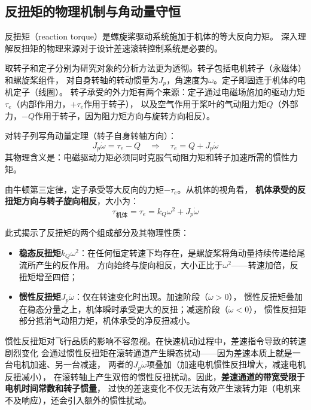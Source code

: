 \documentclass[a4paper,12pt]{ctexart}
\theoremstyle{plain}
\theoremstyle{definition}
\begin{document}
\subsection{反扭矩的物理机制与角动量守恒}

反扭矩（reaction torque）是螺旋桨驱动系统施加于机体的等大反向力矩。
深入理解反扭矩的物理来源对于设计差速滚转控制系统是必要的。

取转子和定子分别为研究对象的分析方法更为透彻。转子包括电机转子（永磁体）和螺旋桨组件，
对自身转轴的转动惯量为$J_p$，角速度为$\omega$。定子即固连于机体的电机定子（线圈）。
转子承受的外力矩有两个来源：定子通过电磁场施加的驱动力矩$\tau_e$（内部作用力，$+\tau_e$作用于转子），
以及空气作用于桨叶的气动阻力矩$Q$（外部力，$-Q$作用于转子，因为阻力矩方向与旋转方向相反）\cite{ducard2011fault}。

对转子列写角动量定理（转子自身转轴方向）：
\begin{equation}
    J_p \dot{\omega} = \tau_e - Q \quad\Longrightarrow\quad
    \tau_e = Q + J_p \dot{\omega}
    \label{eq:rotor_angular}
\end{equation}
其物理含义是：电磁驱动力矩必须同时克服气动阻力矩和转子加速所需的惯性力矩。

由牛顿第三定律，定子承受等大反向的力矩$-\tau_e$。从机体的视角看，
\textbf{机体承受的反扭矩方向与转子旋向相反}，大小为：
\begin{equation}
    \boxed{\tau_{\text{机体}} = \tau_e = k_Q \omega^2 + J_p \dot{\omega}}
    \label{eq:reaction_torque}
\end{equation}

此式揭示了反扭矩的两个组成部分及其物理性质：
\begin{itemize}
    \item \textbf{稳态反扭矩}$k_Q \omega^2$：在任何恒定转速下均存在，是螺旋桨将角动量持续传递给尾流所产生的反作用。
          方向始终与旋向相反，大小正比于$\omega^2$——转速加倍，反扭矩增至四倍；
    \item \textbf{惯性反扭矩}$J_p \dot{\omega}$：仅在转速变化时出现。加速阶段（$\dot{\omega} > 0$），
         惯性反扭矩叠加在稳态分量之上，机体瞬时承受更大的反扭；减速阶段（$\dot{\omega} < 0$），
         惯性反扭矩部分抵消气动阻力矩，机体承受的净反扭减小。
\end{itemize}

惯性反扭矩对飞行品质的影响不容忽视。在快速机动过程中，差速指令导致的转速剧烈变化
会通过惯性反扭矩在滚转通道产生瞬态扰动——因为差速本质上就是一台电机加速、另一台减速，
两者的$J_p \dot{\omega}$项叠加（加速电机惯性反扭增大，减速电机反扭减小），
在滚转轴上产生双倍的惯性反扭扰动。因此，\textbf{差速通道的带宽受限于电机时间常数和转子惯量}，
过快的差速变化不仅无法有效产生滚转力矩（电机来不及响应），还会引入额外的惯性扰动。
\end{document}
